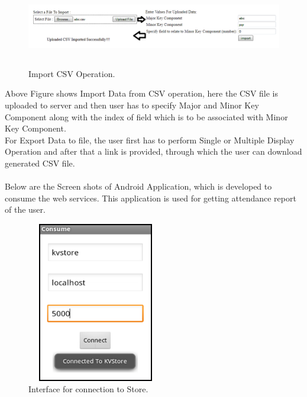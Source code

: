 \begin{figure}[h]
\centering
  \includegraphics[width=13cm,height=3.5cm]{ERD4.png}
  \caption{Import CSV Operation.}\label{Import CSV Operation.}
\end{figure}
Above Figure shows Import Data from CSV operation, here the CSV file is uploaded to server and then user has to specify Major and Minor Key Component along with the index of field which is to be associated with Minor Key Component. \\
For Export Data to file, the user first has to perform Single or Multiple Display Operation and after that a link is provided, through which the user can download generated CSV file. \\ \\
Below are the Screen shots of Android Application, which is developed to consume the web services. This application is used for getting attendance report of the user.
\begin{figure}[h]
\centering
  \includegraphics[width=6cm,height=7cm]{ERD5.png}
  \caption{Interface for connection to Store.}\label{Interface for connection to Store.}
\end{figure}
\\
\\
\\
\\
